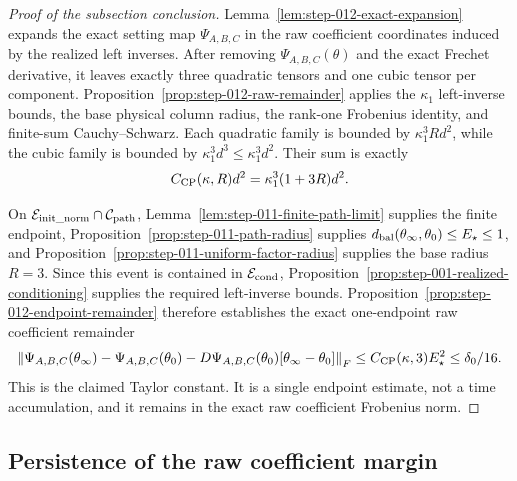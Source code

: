 \begin{proof}[Proof of the subsection conclusion]

Lemma~\ref{lem:step-012-exact-expansion} expands the exact setting map
\(\Psi_{A,B,C}\) in the raw coefficient coordinates induced by the realized
left inverses. After removing \(\Psi_{A,B,C}(\theta)\) and the exact Frechet
derivative, it leaves exactly three quadratic tensors and one cubic tensor
per component. Proposition~\ref{prop:step-012-raw-remainder} applies the
\(\kappa_1\) left-inverse bounds, the base physical column radius,
the rank-one Frobenius identity, and finite-sum Cauchy--Schwarz. Each
quadratic family is bounded by \(\kappa_1^3Rd^2\), while the cubic family is
bounded by \(\kappa_1^3d^3\le\kappa_1^3d^2\). Their sum is exactly
\[
  C_{\rm CP}(\kappa,R)d^2
  =\kappa_1^3(1+3R)d^2.
\]

On \(\mathcal E_{\rm init\_norm}\cap\mathcal C_{\rm path}\),
Lemma~\ref{lem:step-011-finite-path-limit} supplies the finite endpoint,
Proposition~\ref{prop:step-011-path-radius} supplies
\(d_{\rm bal}(\theta_\infty,\theta_0)\le E_\star\le1\), and
Proposition~\ref{prop:step-011-uniform-factor-radius} supplies the base
radius \(R=3\). Since this event is
contained in \(\mathcal E_{\rm cond}\),
Proposition~\ref{prop:step-001-realized-conditioning} supplies the required
left-inverse bounds. Proposition~\ref{prop:step-012-endpoint-remainder}
therefore establishes the exact one-endpoint raw coefficient remainder
\[
  \left\|\Psi_{A,B,C}(\theta_\infty)-\Psi_{A,B,C}(\theta_0)
      -D\Psi_{A,B,C}(\theta_0)[\theta_\infty-\theta_0]\right\|_F
  \le C_{\rm CP}(\kappa,3)E_\star^2
  \le\delta_0/16.
\]
This is the claimed Taylor constant. It is a single endpoint estimate, not a
time accumulation, and it remains in the exact raw coefficient Frobenius
norm.

\end{proof}

\subsection{Persistence of the raw coefficient margin}\label{app:step-013}

